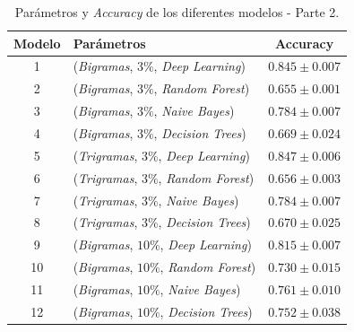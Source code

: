\documentclass[es]{uc3mreport}
\begin{document}
\begin{report}
    \begin{table}[H]
        \begin{center}
            \begin{tabular}{ @{}clc@{} }
                \toprule
                Modelo & Parámetros\footnotemark[2] & Accuracy\\
                \midrule
                1  & (\textit{Bigramas},  $3\%$, \textit{Deep Learning})  & $0.845 \pm 0.007$ \\
                2  & (\textit{Bigramas},  $3\%$, \textit{Random Forest})  & $0.655 \pm 0.001$ \\
                3  & (\textit{Bigramas},  $3\%$, \textit{Naive Bayes})    & $0.784 \pm 0.007$ \\
                4  & (\textit{Bigramas},  $3\%$, \textit{Decision Trees}) & $0.669 \pm 0.024$ \\
                5  & (\textit{Trigramas}, $3\%$, \textit{Deep Learning})  & $0.847 \pm 0.006$ \\
                6  & (\textit{Trigramas}, $3\%$, \textit{Random Forest})  & $0.656 \pm 0.003$ \\
                7  & (\textit{Trigramas}, $3\%$, \textit{Naive Bayes})    & $0.784 \pm 0.007$ \\
                8  & (\textit{Trigramas}, $3\%$, \textit{Decision Trees}) & $0.670 \pm 0.025$ \\
                9  & (\textit{Bigramas}, $10\%$, \textit{Deep Learning})  & $0.815 \pm 0.007$ \\
                10 & (\textit{Bigramas}, $10\%$, \textit{Random Forest})  & $0.730 \pm 0.015$ \\
                11 & (\textit{Bigramas}, $10\%$, \textit{Naive Bayes})    & $0.761 \pm 0.010$ \\
                12 & (\textit{Bigramas}, $10\%$, \textit{Decision Trees}) & $0.752 \pm 0.038$ \\
                \bottomrule
            \end{tabular}
            \caption{Parámetros y \textit{Accuracy} de los diferentes modelos -
            Parte 2.}
        \end{center}
    \end{table}


\end{report}
\end{document}
